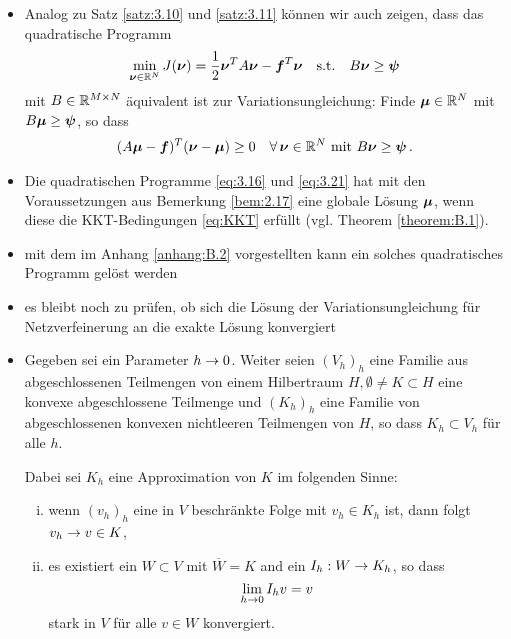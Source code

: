\begin{itemize}
\item \begin{bem}
Analog zu Satz \ref{satz:3.10} und \ref{satz:3.11} können wir auch zeigen, dass das quadratische Programm
\begin{align}\label{eq:3.21}
	\min_{\boldsymbol\nu \in \mathbb{R}^N} J(\boldsymbol\nu) = \frac 1 2 \boldsymbol \nu^T A \boldsymbol \nu - \boldsymbol f^T \boldsymbol \nu \quad \text{s.t.} \quad B\boldsymbol\nu \ge \boldsymbol \psi
\end{align}
mit $B \in \mathbb{R}^{M\times N}$ äquivalent ist zur Variationsungleichung: Finde $\boldsymbol\mu \in \mathbb{R}^N$ mit $B\boldsymbol\mu \ge \boldsymbol \psi$, so dass
\begin{align}\label{eq:3.22}
	(A\boldsymbol\mu - \boldsymbol f)^T (\boldsymbol\nu-\boldsymbol\mu) \ge 0 \quad \forall\, \boldsymbol\nu \in \mathbb{R}^N \text{ mit } B \boldsymbol \nu \ge \boldsymbol\psi \, .
\end{align}
\end{bem}


\item \begin{bem}
Die quadratischen Programme \eqref{eq:3.16} und \eqref{eq:3.21} hat mit den Voraussetzungen aus Bemerkung \ref{bem:2.17} eine globale Lösung $\boldsymbol\mu$, wenn diese die KKT-Bedingungen \eqref{eq:KKT} erfüllt (vgl. Theorem \ref{theorem:B.1}).
\end{bem}

\item mit dem im Anhang \ref{anhang:B.2} vorgestellten  kann ein solches quadratisches Programm gelöst werden

\item es bleibt noch zu prüfen, ob sich die Lösung der Variationsungleichung für Netzverfeinerung an die exakte Lösung konvergiert

\item \begin{vor}
Gegeben sei ein Parameter $h \rightarrow 0$. Weiter seien $(V_h)_h$ eine Familie aus abgeschlossenen Teilmengen von einem Hilbertraum $H, \emptyset \not= K \subset H$ eine konvexe abgeschlossene Teilmenge und $(K_h)_h$ eine Familie von abgeschlossenen konvexen nichtleeren Teilmengen von $H$, so dass $K_h \subset V_h$ für alle $h$.

Dabei sei $K_h$ eine Approximation von $K$ im folgenden Sinne:
\begin{enumerate}[(i)]
\item wenn $(v_h)_h$ eine in $V$ beschränkte Folge mit $v_h \in K_h$ ist, dann folgt $v_h \rightarrow v \in K$,
\item es existiert ein $W \subset V$ mit $\overline W = K$ and ein $I_h: W \rightarrow K_h$, so dass
\[
	\lim_{h\rightarrow 0} I_h v = v
\]
stark in $V$ für alle $v \in W$ konvergiert.
\end{enumerate}
\end{vor}


\end{itemize}
